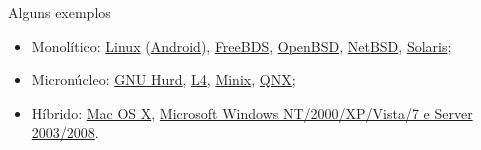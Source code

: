 \begin{frame}{Alguns exemplos}
  
  \begin{itemize}
  \item Monolítico: \href{http://www.linux.org/}{Linux} (\href{http://www.android.com/}{Android}),
    \href{http://www.freebsd.org/}{FreeBDS},
    \href{http://www.openbsd.org/}{OpenBSD},
    \href{http://www.netbsd.org/}{NetBSD}, 
    \href{http://www.oracle.com/solaris}{Solaris};
  \item Micronúcleo:
    \href{http://www.gnu.org/software/hurd/hurd.html}{GNU Hurd},
    \href{http://os.inf.tu-dresden.de/L4/}{L4}, 
    \href{http://www.minix3.org/}{Minix},
    \href{http://www.qnx.com/}{QNX};
  \item Híbrido: \href{http://www.apple.com/macosx/}{Mac OS X},
    \href{http://www.microsoft.com/windows/default.aspx}{Microsoft Windows NT/2000/XP/Vista/7 e Server 2003/2008}.
  \end{itemize}
\end{frame}


